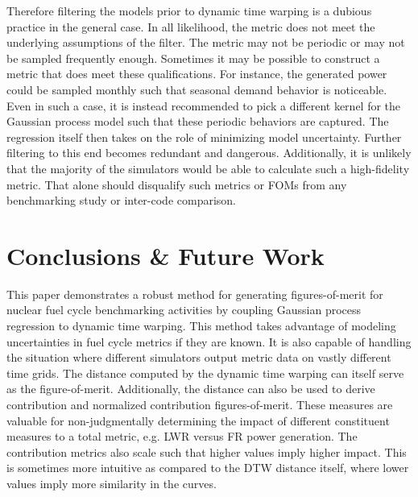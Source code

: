 \documentclass{ntmanuscript}
\begin{document}
Therefore filtering the models prior to dynamic time warping is a dubious practice
in the general case. In all likelihood, the metric does not meet the underlying
assumptions of the filter. The metric may not be periodic or may not be sampled
frequently enough. Sometimes it may be possible to construct a metric that does
meet these qualifications. For instance, the generated power could be sampled monthly
such that seasonal demand behavior is noticeable. Even in such a case, it is instead recommended
to pick a different kernel for the Gaussian process model such that these
periodic behaviors are captured.  The regression itself then takes on the role of
minimizing model uncertainty. Further filtering to this end becomes redundant and
dangerous.  Additionally, it is unlikely that
the majority of the simulators would be able to calculate such a high-fidelity metric.
That alone should disqualify such metrics or FOMs from any benchmarking study or
inter-code comparison.

\section{Conclusions \& Future Work}
\label{conclusion}

This paper demonstrates a robust method for generating figures-of-merit
for nuclear fuel cycle benchmarking activities by coupling Gaussian process
regression to dynamic time warping. This method takes advantage of modeling
uncertainties in fuel cycle metrics if they are known. It is also capable
of handling the situation where different simulators output metric data on
vastly different time grids. The distance computed by the dynamic time
warping can itself serve as the figure-of-merit. Additionally, the
distance can also be used to derive contribution and normalized contribution
figures-of-merit. These measures are valuable for non-judgmentally
determining the impact of different constituent measures to a total
metric, e.g. LWR versus FR power generation. The contribution metrics also
scale such that higher values imply higher impact. This is sometimes
more intuitive as compared to the DTW distance itself, where lower values
imply more similarity in the curves.
\end{document}
